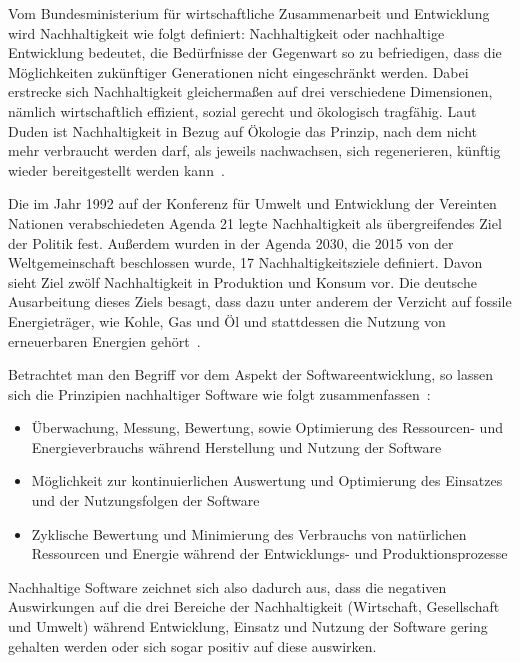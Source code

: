 Vom Bundesministerium für wirtschaftliche Zusammenarbeit und Entwicklung~\cite{BundesministeriumWirtschaftlicheZusammenarbeitundEntwicklung} wird Nachhaltigkeit wie folgt definiert:
\glqq Nachhaltigkeit oder nachhaltige Entwicklung bedeutet, die Bedürfnisse der Gegenwart so zu befriedigen, dass die Möglichkeiten zukünftiger Generationen nicht eingeschränkt werden.\grqq{}
Dabei erstrecke sich Nachhaltigkeit gleichermaßen auf drei verschiedene Dimensionen, nämlich wirtschaftlich effizient, sozial gerecht und ökologisch tragfähig.
Laut Duden ist Nachhaltigkeit in Bezug auf Ökologie das \glqq Prinzip, nach dem nicht mehr verbraucht werden darf, als jeweils nachwachsen, sich regenerieren, künftig wieder bereitgestellt werden kann\grqq{}~\cite{Dudenredaktion.27.04.2018}.

Die im Jahr 1992 auf der Konferenz für Umwelt und Entwicklung der Vereinten Nationen verabschiedeten Agenda 21 legte Nachhaltigkeit als übergreifendes Ziel der Politik fest.
Außerdem wurden in der Agenda 2030, die 2015 von der Weltgemeinschaft beschlossen wurde, 17 Nachhaltigkeitsziele definiert.
Davon sieht Ziel zwölf Nachhaltigkeit in Produktion und Konsum vor.
Die deutsche Ausarbeitung dieses Ziels besagt, dass dazu unter anderem der Verzicht auf fossile Energieträger, wie Kohle, Gas und Öl und stattdessen die Nutzung von erneuerbaren Energien gehört~\cite{Bundesregierunginformiert}.

Betrachtet man den Begriff vor dem Aspekt der Softwareentwicklung, so lassen sich die Prinzipien nachhaltiger Software wie folgt zusammenfassen~\cite{Calero.2015}:
\begin{itemize}
 \item Überwachung, Messung, Bewertung, sowie Optimierung des Ressourcen- und Energieverbrauchs während Herstellung und Nutzung der Software
\item Möglichkeit zur kontinuierlichen Auswertung und Optimierung des Einsatzes und der Nutzungsfolgen der Software
\item Zyklische Bewertung und Minimierung des Verbrauchs von natürlichen Ressourcen und Energie während der Entwicklungs- und Produktionsprozesse
\end{itemize}
Nachhaltige Software zeichnet sich also dadurch aus, dass die negativen Auswirkungen auf die drei Bereiche der Nachhaltigkeit (Wirtschaft, Gesellschaft und Umwelt) während Entwicklung, Einsatz und Nutzung der Software gering gehalten werden oder sich sogar positiv auf diese auswirken.

